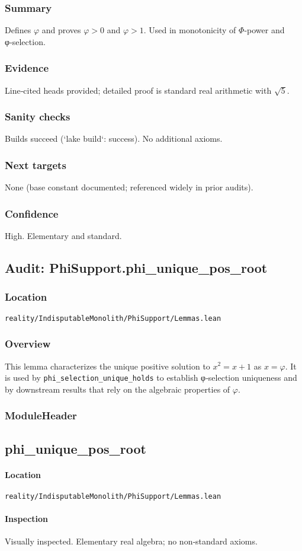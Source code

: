 \documentclass{article}
\newcommand{\FileRef}[1]{\texttt{#1}}
\newcommand{\ModuleHeader}[3]{%
  \subsection{#1}
  \paragraph{Location} \FileRef{#2}\\
  \paragraph{Inspection} #3
}
\begin{document}
\subsubsection{Summary}
Defines \(\varphi\) and proves \(\varphi>0\) and \(\varphi>1\). Used in monotonicity of \(\Phi\)-power and φ‑selection.

\subsubsection{Evidence}
Line‑cited heads provided; detailed proof is standard real arithmetic with \(\sqrt{5}\).

\subsubsection{Sanity checks}
Builds succeed (`lake build`: success). No additional axioms.

\subsubsection{Next targets}
None (base constant documented; referenced widely in prior audits).

\subsubsection{Confidence}
High. Elementary and standard.

\subsection{Audit: PhiSupport.phi\_unique\_pos\_root}
\subsubsection{Location}
\FileRef{reality/IndisputableMonolith/PhiSupport/Lemmas.lean}

\subsubsection{Overview}
This lemma characterizes the unique positive solution to \(x^2 = x + 1\) as \(x=\varphi\). It is used by \texttt{phi\_selection\_unique\_holds} to establish φ‑selection uniqueness and by downstream results that rely on the algebraic properties of \(\varphi\).

\subsubsection{ModuleHeader}
\ModuleHeader{phi\_unique\_pos\_root}{reality/IndisputableMonolith/PhiSupport/Lemmas.lean}{Visually inspected. Elementary real algebra; no non‑standard axioms.}
\end{document}
